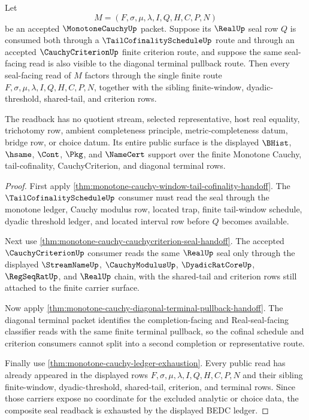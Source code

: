 \begin{theorem}
\label{thm:monotone-cauchy-cofinal-criterion-seal-readback}
Let
$$
M=(F,\sigma,\mu,\lambda,I,Q,H,C,P,N)
$$
be an accepted $\MonotoneCauchyUp$ packet. Suppose its $\RealUp$ seal row $Q$
is consumed both through a $\TailCofinalityScheduleUp$ route and through an
accepted $\CauchyCriterionUp$ finite criterion route, and suppose the same
seal-facing read is also visible to the diagonal terminal pullback route.
Then every seal-facing read of $M$ factors through the single finite route
$F,\sigma,\mu,\lambda,I,Q,H,C,P,N$, together with the sibling finite-window,
dyadic-threshold, shared-tail, and criterion rows.

The readback has no quotient stream, selected representative, host real
equality, trichotomy row, ambient completeness principle, metric-completeness
datum, bridge row, or choice datum. Its entire public surface is the displayed
$\BHist$, $\hsame$, $\Cont$, $\Pkg$, and $\NameCert$ support over the finite
Monotone Cauchy, tail-cofinality, CauchyCriterion, and diagonal terminal
rows.
\end{theorem}
\begin{proof}
First apply \autoref{thm:monotone-cauchy-window-tail-cofinality-handoff}. The
$\TailCofinalityScheduleUp$ consumer must read the seal through the monotone
ledger, Cauchy modulus row, located trap, finite tail-window schedule, dyadic
threshold ledger, and located interval row before $Q$ becomes available.

Next use \autoref{thm:monotone-cauchy-cauchycriterion-seal-handoff}. The
accepted $\CauchyCriterionUp$ consumer reads the same $\RealUp$ seal only
through the displayed $\StreamNameUp$, $\CauchyModulusUp$,
$\DyadicRatCoreUp$, $\RegSeqRatUp$, and $\RealUp$ chain, with the shared-tail
and criterion rows still attached to the finite carrier surface.

Now apply \autoref{thm:monotone-cauchy-diagonal-terminal-pullback-handoff}.
The diagonal terminal packet identifies the completion-facing and
Real-seal-facing classifier reads with the same finite terminal pullback, so
the cofinal schedule and criterion consumers cannot split into a second
completion or representative route.

Finally use \autoref{thm:monotone-cauchy-ledger-exhaustion}. Every public read
has already appeared in the displayed rows
$F,\sigma,\mu,\lambda,I,Q,H,C,P,N$ and their sibling finite-window,
dyadic-threshold, shared-tail, criterion, and terminal rows. Since those
carriers expose no coordinate for the excluded analytic or choice data, the
composite seal readback is exhausted by the displayed BEDC ledger.
\end{proof}

